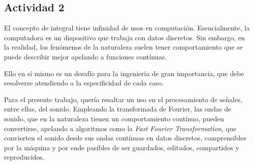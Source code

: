 \subsection*{Actividad 2}

El concepto de integral tiene infinidad de usos en computación.
Esencialmente,
la computadora es un dispositivo que trabaja con datos discretos.
Sin embargo,
en la realidad,
los fenómenos de la naturaleza suelen tener comportamiento que se puede describir mejor apelando a funciones contínuas.

Ello en sí mismo es un desafío para la ingeniería de gran importancia,
que debe resolverse atendiendo a la especificidad de cada caso.

Para el presente trabajo, 
quería resaltar un uso en el procesamiento de señales,
entre ellas,
del sonido.
Empleando la transformada de Fourier,
las ondas de sonido,
que en la naturaleza tienen un comportamiento contínuo,
pueden convertirse,
apelando a algoritmos como la \textit{Fast Fourier Transformation},
que convierten el sonido desde sus ondas contínuas en datos discretos,
comprensibles por la máquina y por ende pasibles de ser guardados,
editados, compartidos y reproducidos.
